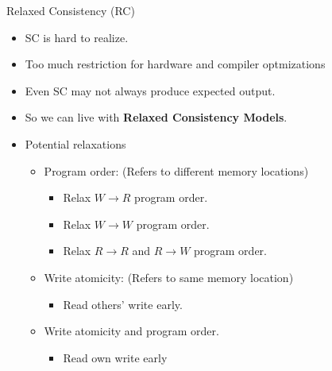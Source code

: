 \documentclass[9pt]{beamer}
\begin{document}
\begin{frame}{Relaxed Consistency (RC)}
\begin{itemize}
\item SC is hard to realize.
\item Too much restriction for hardware and compiler optmizations
\item Even SC may not always produce expected output.
\item So we can live with \textbf{Relaxed Consistency Models}.
\pause
\item Potential relaxations~\cite{rajeev-utah}
  \begin{itemize}
  \item Program order: (Refers to different memory locations)
    \begin{itemize}
    \item Relax $W \rightarrow R$ program order.
    \item Relax $W \rightarrow W$ program order.
    \item Relax $R \rightarrow R$ and $R \rightarrow W$ program order.
    \end{itemize}
\pause
  \item Write atomicity: (Refers to same memory location)
    \begin{itemize}
    \item Read others' write early.
    \end{itemize}
\pause
  \item Write atomicity and program order.
    \begin{itemize}
    \item Read own write early
    \end{itemize}
  \end{itemize}
\end{itemize}
\end{frame}
\end{document}
